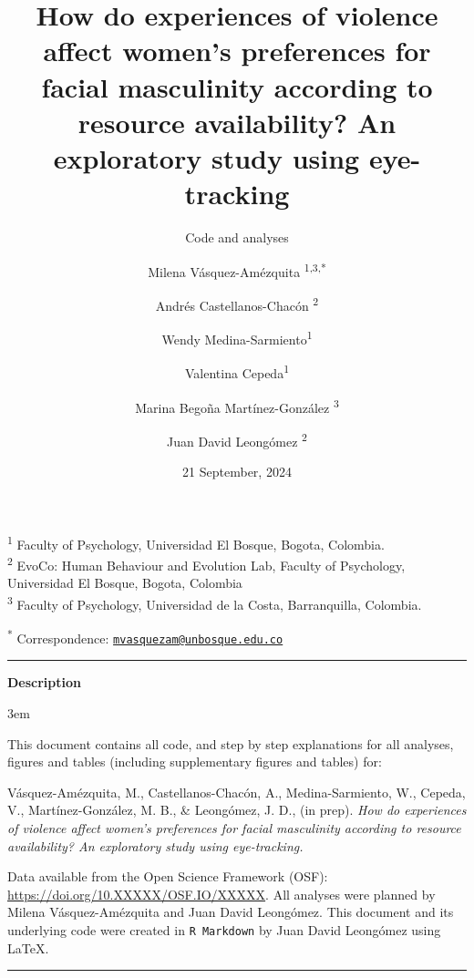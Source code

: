 \documentclass[
  bookmarksnumbered]{article}
\title{How do experiences of violence affect women's preferences for facial masculinity according to resource availability? An exploratory study using eye-tracking}
\subtitle{Code and analyses}
\author{Milena Vásquez-Amézquita \orcidlink{0000-0001-7317-8430}\textsuperscript{1,3,*} \and Andrés Castellanos-Chacón \orcidlink{0000-0003-1684-9319}\textsuperscript{2} \and Wendy Medina-Sarmiento\textsuperscript{1} \and Valentina Cepeda\textsuperscript{1} \and Marina Begoña Martínez-González \orcidlink{0000-0002-5840-6383}\textsuperscript{3} \and Juan David Leongómez \orcidlink{0000-0002-0092-6298}\textsuperscript{2}}
\date{21 September, 2024}
\begin{document}
\maketitle

\textsuperscript{1} Faculty of Psychology, Universidad El Bosque, Bogota, Colombia.\\
\textsuperscript{2} EvoCo: Human Behaviour and Evolution Lab, Faculty of Psychology, Universidad El Bosque, Bogota, Colombia\\
\textsuperscript{3} Faculty of Psychology, Universidad de la Costa, Barranquilla, Colombia.

\textsuperscript{*} Correspondence: \href{mailto:mvasquezam@unbosque.edu.co}{\href{mailto:mvasquezam@unbosque.edu.co}{\nolinkurl{mvasquezam@unbosque.edu.co}}}

\begin{center}\rule{0.5\linewidth}{0.5pt}\end{center}

\begin{center}
\textbf{Description}
\end{center}

\par
\begingroup
\leftskip3em
\rightskip\leftskip

This document contains all code, and step by step explanations for all analyses, figures and tables (including supplementary figures and tables) for:

\begin{hangparas}{.25in}{1}
Vásquez-Amézquita, M., Castellanos-Chacón, A., Medina-Sarmiento, W., Cepeda, V., Martínez-González, M. B., \& Leongómez, J. D.,  (in prep). \textit{How do experiences of violence affect women's preferences for facial masculinity according to resource availability? An exploratory study using eye-tracking.}
\end{hangparas}

Data available from the Open Science Framework (OSF): \url{https://doi.org/10.XXXXX/OSF.IO/XXXXX}. All analyses were planned by Milena Vásquez-Amézquita and Juan David Leongómez. This document and its underlying code were created in \texttt{R\ Markdown} by Juan David Leongómez using \LaTeX.

\begin{center}\rule{0.5\linewidth}{0.5pt}\end{center}

\par
\endgroup

{\hypersetup{hidelinks}
\setcounter{tocdepth}{6}
\tableofcontents
}
\opensupplement
\end{document}
